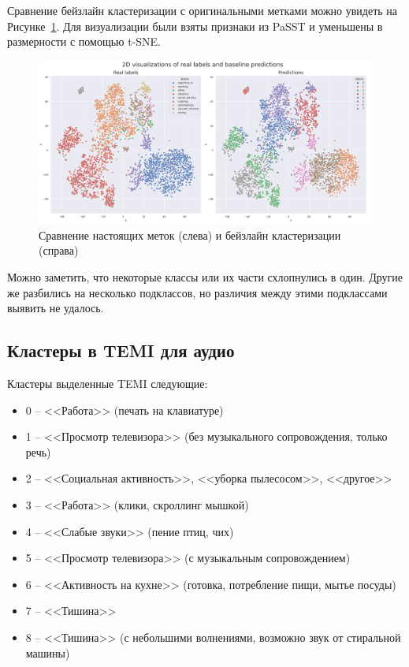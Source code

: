 \documentclass[a4paper,12pt]{extarticle}
\begin{document}
Сравнение бейзлайн кластеризации с оригинальными метками можно 
увидеть на Рисунке~\ref{fig:baseline_visualization}. Для визуализации 
были взяты признаки из PaSST и уменьшены в размерности с помощью t-SNE.

\begin{figure}[ht]
	\centering
	\includegraphics[width=1.0\textwidth]{baseline_visualization.png}
	\caption{Сравнение настоящих меток (слева) и бейзлайн кластеризации (справа)}
	\label{fig:baseline_visualization}
\end{figure}

Можно заметить, что некоторые классы или их части схлопнулись в один. 
Другие же разбились на несколько подклассов, но различия между этими 
подклассами выявить не удалось.

\subsection{Кластеры в TEMI для аудио}

Кластеры выделенные TEMI следующие:

\begin{itemize}
    \item 0 -- <<Работа>> (печать на клавиатуре)
    \item 1 -- <<Просмотр телевизора>> (без музыкального сопровождения, только речь)
    \item 2 -- <<Социальная активность>>, <<уборка пылесосом>>, <<другое>>
    \item 3 -- <<Работа>> (клики, скроллинг мышкой)
    \item 4 -- <<Слабые звуки>> (пение птиц, чих)
    \item 5 -- <<Просмотр телевизора>> (с музыкальным сопровождением)
    \item 6 -- <<Активность на кухне>> (готовка, потребление пищи, мытье посуды)
    \item 7 -- <<Тишина>>
    \item 8 -- <<Тишина>> (с небольшими волнениями, возможно звук от стиральной машины)
\end{itemize}
\end{document}
